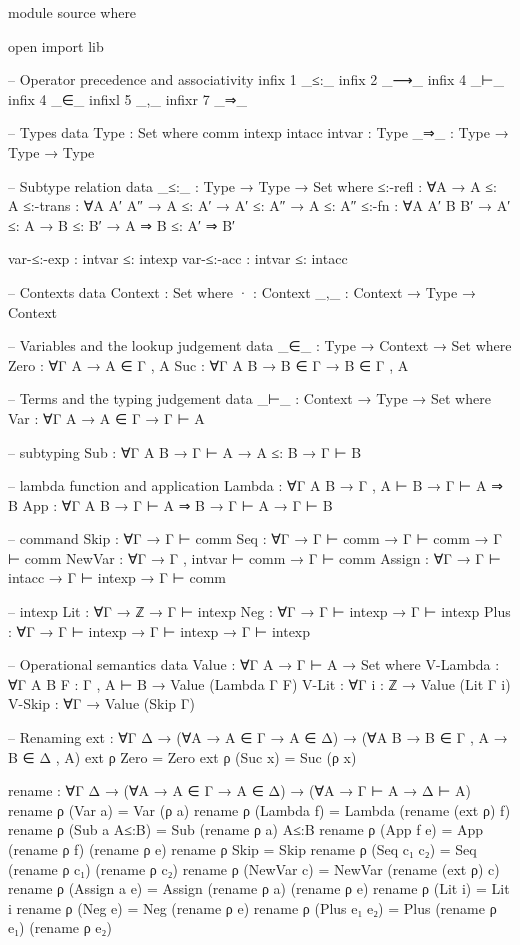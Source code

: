 \documentclass{article}
\begin{document}
\begin{prev}
\begin{code}
module source where

open import lib

-- Operator precedence and associativity
infix 1 _≤:_
infix 2 _⟶_ 
infix 4 _⊢_
infix 4 _∈_
infixl 5 _,_
infixr 7 _⇒_

-- Types
data Type : Set where
    comm intexp intacc intvar : Type
    _⇒_ : Type → Type → Type

-- Subtype relation
data _≤:_ : Type → Type → Set where
    ≤:-refl : ∀{A} → A ≤: A
    ≤:-trans : ∀{A A′ A″} → A ≤: A′ → A′ ≤: A″ → A ≤: A″
    ≤:-fn : ∀{A A′ B B′} → A′ ≤: A → B ≤: B′ → A ⇒ B ≤: A′ ⇒ B′

    var-≤:-exp : intvar ≤: intexp
    var-≤:-acc : intvar ≤: intacc

-- Contexts
data Context : Set where
    · : Context
    _,_ : Context → Type → Context

-- Variables and the lookup judgement
data _∈_ : Type → Context → Set where
    Zero : ∀{Γ A} → A ∈ Γ , A
    Suc : ∀{Γ A B} → B ∈ Γ → B ∈ Γ , A

-- Terms and the typing judgement
data _⊢_ : Context → Type → Set where
    Var : ∀{Γ A} → A ∈ Γ → Γ ⊢ A

    -- subtyping
    Sub : ∀{Γ A B} → Γ ⊢ A → A ≤: B → Γ ⊢ B

    -- lambda function and application
    Lambda : ∀{Γ A B} → Γ , A ⊢ B → Γ ⊢ A ⇒ B
    App : ∀{Γ A B} → Γ ⊢ A ⇒ B → Γ ⊢ A → Γ ⊢ B

    -- command
    Skip : ∀{Γ} → Γ ⊢ comm
    Seq : ∀{Γ} → Γ ⊢ comm → Γ ⊢ comm → Γ ⊢ comm
    NewVar : ∀{Γ} → Γ , intvar ⊢ comm → Γ ⊢ comm
    Assign : ∀{Γ} → Γ ⊢ intacc → Γ ⊢ intexp → Γ ⊢ comm

    -- intexp
    Lit : ∀{Γ} → ℤ → Γ ⊢ intexp
    Neg : ∀{Γ} → Γ ⊢ intexp → Γ ⊢ intexp
    Plus : ∀{Γ} → Γ ⊢ intexp → Γ ⊢ intexp → Γ ⊢ intexp


-- Operational semantics
data Value : ∀{Γ A} → Γ ⊢ A → Set where
    V-Lambda : ∀{Γ A B} {F : Γ , A ⊢ B} → Value (Lambda {Γ} F)
    V-Lit : ∀{Γ} {i : ℤ} → Value (Lit {Γ} i)
    V-Skip : ∀{Γ} → Value (Skip {Γ})

-- Renaming
ext : ∀{Γ Δ} → (∀{A} → A ∈ Γ → A ∈ Δ)
             → (∀{A B} → B ∈ Γ , A → B ∈ Δ , A)
ext ρ Zero = Zero
ext ρ (Suc x) = Suc (ρ x)

rename : ∀{Γ Δ} → (∀{A} → A ∈ Γ → A ∈ Δ) 
                → (∀{A} → Γ ⊢ A → Δ ⊢ A)
rename ρ (Var a) = Var (ρ a)
rename ρ (Lambda f) = Lambda (rename (ext ρ) f)
rename ρ (Sub a A≤:B) = Sub (rename ρ a) A≤:B
rename ρ (App f e) = App (rename ρ f) (rename ρ e)
rename ρ Skip = Skip
rename ρ (Seq c₁ c₂) = Seq (rename ρ c₁) (rename ρ c₂)
rename ρ (NewVar c) = NewVar (rename (ext ρ) c)
rename ρ (Assign a e) = Assign (rename ρ a) (rename ρ e)
rename ρ (Lit i) = Lit i
rename ρ (Neg e) = Neg (rename ρ e)
rename ρ (Plus e₁ e₂) = Plus (rename ρ e₁) (rename ρ e₂)


\end{code}
\end{prev}
\end{document}
